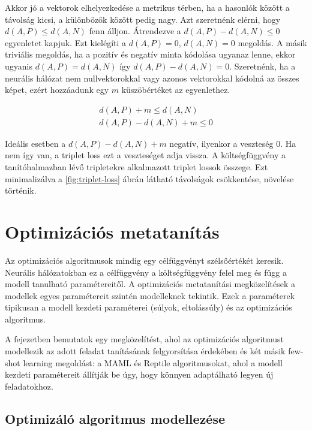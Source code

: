 Akkor jó a vektorok elhelyezkedése a metrikus térben, ha a hasonlók között a távolság kicsi, a különbözők között pedig nagy. Azt szeretnénk elérni, hogy
$d(A, P) \le d(A, N)$ fenn álljon. Átrendezve a $d(A, P) - d(A, N) \le 0$ egyenletet kapjuk. Ezt kielégíti a $d(A, P) = 0$, $d(A, N) = 0$ megoldás. A másik triviális megoldás, ha a pozitív és negatív minta kódolása ugyanaz lenne, ekkor ugyanis $d(A, P) = d(A, N)$ így $d(A, P) - d(A, N) = 0$. Szeretnénk, ha a neurális hálózat nem nullvektorokkal vagy azonos vektorokkal kódolná az összes képet, ezért hozzáadunk egy $m$ küszöbértéket az egyenlethez.

\begin{equation}\label{eq:5}
	\begin{aligned}
		d(A, P) + m \le d(A, N) \\
		d(A, P) - d(A, N) + m \le 0
	\end{aligned}
\end{equation}

Ideális esetben a $d(A, P) - d(A, N) + m$ negatív, ilyenkor a veszteség 0. Ha nem így van, a triplet loss ezt a veszteséget adja vissza. A költségfüggvény a tanítóhalmazban lévő tripletekre alkalmazott triplet lossok összege. Ezt minimalizálva a \ref{fig:triplet-loss} ábrán látható távolságok csökkentése, növelése történik.

\section{Optimizációs metatanítás}

Az optimizációs algoritmusok mindig egy célfüggvényt szélsőértékét keresik. Neurális
hálózatokban ez a célfüggvény a költségfüggvény felel meg és függ a modell tanulható paramétereitől. A optimizációs metatanítási megközelítések a modellek egyes paramétereit szintén modelleknek tekintik. Ezek a paraméterek tipikusan a modell kezdeti paraméterei (súlyok, eltolássúly) és az optimizációs algoritmus.

A fejezetben bemutatok egy megközelítést, ahol az optimizációs algoritmust modellezik az adott feladat tanításának felgyorsítása érdekében és két másik few-shot learning megoldást: a MAML és Reptile algoritmusokat, ahol a modell kezdeti paramétereit állítják be úgy, hogy könnyen adaptálható legyen új feladatokhoz.

\subsection{Optimizáló algoritmus modellezése}

